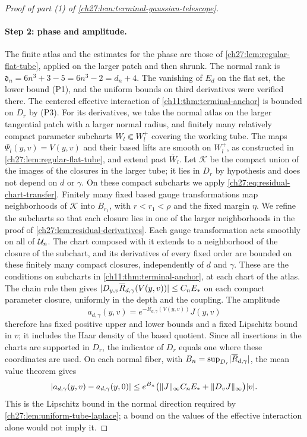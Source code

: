 \begin{proof}[Proof of part (1) of \cref{ch27:lem:terminal-gaussian-telescope}]
\paragraph{Step 2: phase and amplitude.}
The finite atlas and the estimates for the phase are those of \cref{ch27:lem:regular-flat-tube}, applied on the larger patch and then shrunk. The normal rank is $\mathfrak d_n=6n^3+3-5=6n^3-2=d_n+4$. The vanishing of $E_d$ on the flat set, the lower bound (P1), and the uniform bounds on third derivatives were verified there. The centered effective interaction of \cref{ch11:thm:terminal-anchor} is bounded on $D_r$ by (P3). For its derivatives, we take the normal atlas on the larger tangential patch with a larger normal radius, and finitely many relatively compact parameter subcharts $W_l\Subset W_l^+$ covering the working tube. The maps $\Psi_l(y,v)=V(y,v)$ and their based lifts are smooth on $W_l^+$, as constructed in \cref{ch27:lem:regular-flat-tube}, and extend past $\overline W_l$. Let $\mathcal K$ be the compact union of the images of the closures in the larger tube; it lies in $D_r$ by hypothesis and does not depend on $d$ or $\gamma$. On these compact subcharts we apply \eqref{ch27:eq:residual-chart-transfer}. Finitely many fixed based gauge transformations map neighborhoods of $\mathcal K$ into $B_{r_1}$, with $r<r_1<\rho$ and the fixed margin $\eta$. We refine the subcharts so that each closure lies in one of the larger neighborhoods in the proof of \cref{ch27:lem:residual-derivatives}. Each gauge transformation acts smoothly on all of $\mathcal U_{n}$. The chart composed with it extends to a neighborhood of the closure of the subchart, and its derivatives of every fixed order are bounded on these finitely many compact closures, independently of $d$ and $\gamma$. These are the conditions on subcharts in \cref{ch11:thm:terminal-anchor}, at each chart of the atlas. The chain rule then gives $\lvert D_{y,v}\overline R_{d,\gamma}(V(y,v))\rvert\le C_nE_*$ on each compact parameter closure, uniformly in the depth and the coupling. The amplitude
\[
 a_{d,\gamma}(y,v)=e^{-\overline R_{d,\gamma}(V(y,v))}J(y,v)
\]
therefore has fixed positive upper and lower bounds and a fixed Lipschitz bound in $v$; it includes the Haar density of the based quotient. Since all insertions in the charts are supported in $D_r$, the indicator of $D_r$ equals one where these coordinates are used. On each normal fiber, with $B_n=\sup_{D_r}\lvert \overline R_{d,\gamma}\rvert$, the mean value theorem gives
\[
 \lvert a_{d,\gamma}(y,v)-a_{d,\gamma}(y,0)\rvert\le e^{B_n}\bigl(\lVert J\rVert_\infty C_nE_*+\lVert D_vJ\rVert_\infty\bigr)\lvert v\rvert.
\]
This is the Lipschitz bound in the normal direction required by \cref{ch27:lem:uniform-tube-laplace}; a bound on the values of the effective interaction alone would not imply it.


\end{proof}
